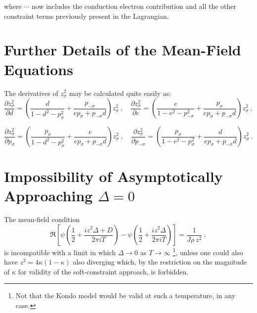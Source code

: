 where $ \cdots $ now includes the conduction electron contribution and all the other constraint terms previously present in the Lagrangian.



\section{Further Details of the Mean-Field Equations}
\label{sec:MF_eq_details}

The derivatives of $ z^2_{\sigma} $ may be calculated quite easily as:
\begin{equation}
\frac{\partial z^2_{\sigma}}{\partial d} = \left( \frac{d}{1 - d^2 - p^2_{\sigma}} + \frac{p_{-\sigma}}{e p_{\sigma} + p_{- \sigma} d} \right) z^2_{\sigma} ~, \quad \frac{\partial z^2_{\sigma}}{\partial e} = \left( \frac{e}{1 - e^2 - p^2_{-\sigma}} + \frac{p_{\sigma}}{e p_{\sigma} + p_{- \sigma} d} \right) z^2_{\sigma} ~,
\end{equation}

\begin{equation}
\frac{\partial z^2_{\sigma}}{\partial p_{\sigma}} = \left( \frac{p_{\sigma}}{1 - d^2 - p^2_{\sigma}} + \frac{e}{e p_{\sigma} + p_{- \sigma} d} \right) z^2_{\sigma} ~, \quad \frac{\partial z^2_{\sigma}}{\partial p_{-\sigma}} = \left( \frac{p_{\sigma}}{1 - e^2 - p^2_{\sigma}} + \frac{d}{e p_{\sigma} + p_{- \sigma} d} \right) z^2_{\sigma} ~.
\end{equation}

\section{Impossibility of Asymptotically Approaching $ \Delta = 0 $}

The mean-field condition
\begin{equation}
\Re{\left[ \psi \left( \frac{1}{2} + \frac{i z^2 \Delta + D}{2 \pi i T} \right) - \psi \left( \frac{1}{2} + \frac{i z^2 \Delta}{2 \pi i T} \right) \right] = \frac{1}{J \rho ~ z^2}} ~ ,
\end{equation}
is incompatible with a limit in which $ \Delta \rightarrow 0 $ as $ T \rightarrow \infty $ \footnote{Not that the Kondo model would be valid at such a temperature, in any case.}, unless one could also have $ z^2 = 4 \kappa (1 - \kappa) $ also diverging which, by the restriction on the magnitude of $ \kappa $ for validity of the soft-constraint approach, is forbidden.

